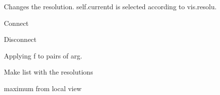 \documentclass[letterpaper,10pt,openany,oneside]{sphinxmanual}
\begin{document}
\begin{fulllineitems}
\begin{fulllineitems}
\end{fulllineitems}


\begin{fulllineitems}
\label{rst/visu2d:Visu.display.DISPLAY.change_resolution}
Changes the resolution.
self.currentd is selected according to vis.resolu.

\end{fulllineitems}


\begin{fulllineitems}
\label{rst/visu2d:Visu.display.DISPLAY.connect}
Connect

\end{fulllineitems}


\begin{fulllineitems}
\label{rst/visu2d:Visu.display.DISPLAY.disconnect}
Disconnect

\end{fulllineitems}


\begin{fulllineitems}
\label{rst/visu2d:Visu.display.DISPLAY.distrib}
Applying f to pairs of arg.

\end{fulllineitems}


\begin{fulllineitems}
\label{rst/visu2d:Visu.display.DISPLAY.list_res}
Make list with the resolutions

\end{fulllineitems}


\begin{fulllineitems}
\label{rst/visu2d:Visu.display.DISPLAY.local_abs_max}
maximum from local view


\end{fulllineitems}
\end{fulllineitems}
\end{document}
